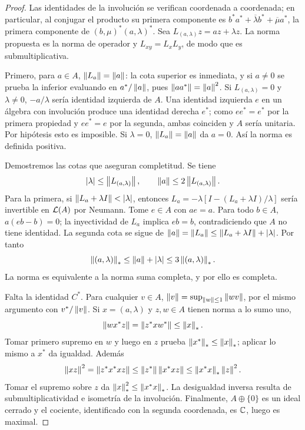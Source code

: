 \begin{proof}
Las identidades de la involución se verifican coordenada a coordenada; en particular, al conjugar el producto su primera componente es $b^*a^*+\overline\lambda b^*+\overline\mu a^*$, la primera componente de $(b,\mu)^*(a,\lambda)^*$. Sea $L_{(a,\lambda)}z=az+\lambda z$. La norma propuesta es la norma de operador y $L_{xy}=L_xL_y$, de modo que es submultiplicativa.

Primero, para $a\in A$, $\left\lVert L_a\right\rVert=\left\lVert a\right\rVert$: la cota superior es inmediata, y si $a\ne0$ se prueba la inferior evaluando en $a^*/\left\lVert a\right\rVert$, pues $\left\lVert aa^*\right\rVert=\left\lVert a\right\rVert^2$. Si $L_{(a,\lambda)}=0$ y $\lambda\ne0$, $-a/\lambda$ sería identidad izquierda de $A$. Una identidad izquierda $e$ en un álgebra con involución produce una identidad derecha $e^*$; como $ee^*=e^*$ por la primera propiedad y $ee^*=e$ por la segunda, ambas coinciden y $A$ sería unitaria. Por hipótesis esto es imposible. Si $\lambda=0$, $\left\lVert L_a\right\rVert=\left\lVert a\right\rVert$ da $a=0$. Así la norma es definida positiva.

Demostremos las cotas que aseguran completitud. Se tiene
\[
 |\lambda|\le\left\lVert L_{(a,\lambda)}\right\rVert,\qquad
 \left\lVert a\right\rVert\le2\left\lVert L_{(a,\lambda)}\right\rVert.
\]
Para la primera, si $\norm{L_a+\lambda I}<|\lambda|$, entonces $L_a=-\lambda[I-(L_a+\lambda I)/\lambda]$ sería invertible en $\mathcal L(A)$ por Neumann. Tome $e\in A$ con $ae=a$. Para todo $b\in A$, $a(eb-b)=0$; la inyectividad de $L_a$ implica $eb=b$, contradiciendo que $A$ no tiene identidad. La segunda cota se sigue de $\left\lVert a\right\rVert=\left\lVert L_a\right\rVert\le\left\lVert L_a+\lambda I\right\rVert+|\lambda|$. Por tanto
\[
 \left\lVert(a,\lambda)\right\rVert_*\le\left\lVert a\right\rVert+|\lambda|
 \le3\left\lVert(a,\lambda)\right\rVert_*.
\]
La norma es equivalente a la norma suma completa, y por ello es completa.

Falta la identidad $C^*$. Para cualquier $v\in A$,
$\left\lVert v\right\rVert=\sup_{\left\lVert w\right\rVert\le1}\left\lVert wv\right\rVert$, por el mismo argumento con $v^*/\left\lVert v\right\rVert$. Si $x=(a,\lambda)$ y $z,w\in A$ tienen norma a lo sumo uno,
\[
 \left\lVert wx^*z\right\rVert=\left\lVert z^*xw^*\right\rVert\le\left\lVert x\right\rVert_*.
\]
Tomar primero supremo en $w$ y luego en $z$ prueba $\left\lVert x^*\right\rVert_*\le\left\lVert x\right\rVert_*$; aplicar lo mismo a $x^*$ da igualdad. Además
\[
 \left\lVert xz\right\rVert^2=\left\lVert z^*x^*xz\right\rVert\le\left\lVert z^*\right\rVert\left\lVert x^*xz\right\rVert
 \le\left\lVert x^*x\right\rVert_*\left\lVert z\right\rVert^2.
\]
Tomar el supremo sobre $z$ da $\left\lVert x\right\rVert_*^2\le\left\lVert x^*x\right\rVert_*$. La desigualdad inversa resulta de submultiplicatividad e isometría de la involución. Finalmente, $A\oplus\{0\}$ es un ideal cerrado y el cociente, identificado con la segunda coordenada, es $\mathbb C$, luego es maximal.
\end{proof}

